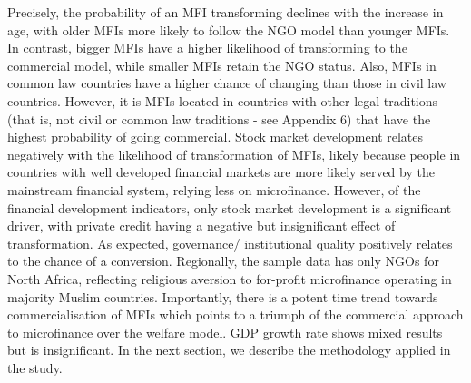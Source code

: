 \documentclass[a4paper,nobind]{templates/ociamthesis}
\begin{document}
Precisely, the probability of an MFI transforming declines with the increase in age, with older MFIs more likely to follow the NGO model than younger MFIs. In contrast, bigger MFIs have a higher likelihood of transforming to the commercial model, while smaller MFIs retain the NGO status. Also, MFIs in common law countries have a higher chance of changing than those in civil law countries. However, it is MFIs located in countries with other legal traditions (that is, not civil or common law traditions - see Appendix 6) that have the highest probability of going commercial. Stock market development relates negatively with the likelihood of transformation of MFIs, likely because people in countries with well developed financial markets are more likely served by the mainstream financial system, relying less on microfinance. However, of the financial development indicators, only stock market development is a significant driver, with private credit having a negative but insignificant effect of transformation. As expected, governance/ institutional quality positively relates to the chance of a conversion. Regionally, the sample data has only NGOs for North Africa, reflecting religious aversion to for-profit microfinance operating in majority Muslim countries. Importantly, there is a potent time trend towards commercialisation of MFIs which points to a triumph of the commercial approach to microfinance over the welfare model. GDP growth rate shows mixed results but is insignificant. In the next section, we describe the methodology applied in the study.
\end{document}
